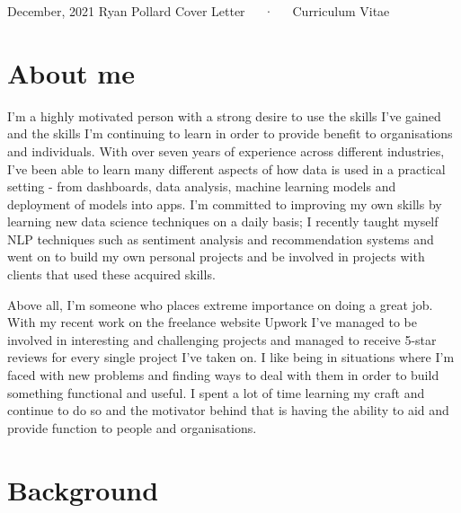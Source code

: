 \documentclass[11pt, a4paper]{awesome-cv}
\begin{document}
\makecvheader

\makecvfooter
  {December, 2021}
    {Ryan Pollard \textbar{} Cover Letter~~~·~~~Curriculum Vitae}
  {\thepage}





\hypertarget{about-me}{%
\section{About me}\label{about-me}}

I'm a highly motivated person with a strong desire to use the skills
I've gained and the skills I'm continuing to learn in order to provide
benefit to organisations and individuals. With over seven years of
experience across different industries, I've been able to learn many
different aspects of how data is used in a practical setting - from
dashboards, data analysis, machine learning models and deployment of
models into apps. I'm committed to improving my own skills by learning
new data science techniques on a daily basis; I recently taught myself
NLP techniques such as sentiment analysis and recommendation systems and
went on to build my own personal projects and be involved in projects
with clients that used these acquired skills.

Above all, I'm someone who places extreme importance on doing a great
job. With my recent work on the freelance website Upwork I've managed to
be involved in interesting and challenging projects and managed to
receive 5-star reviews for every single project I've taken on. I like
being in situations where I'm faced with new problems and finding ways
to deal with them in order to build something functional and useful. I
spent a lot of time learning my craft and continue to do so and the
motivator behind that is having the ability to aid and provide function
to people and organisations.

\hypertarget{background}{%
\section{Background}\label{background}}
\end{document}
